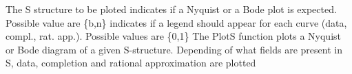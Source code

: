 %
%
%
%
%
%
%
%
%
{}%
{
\fitem[S] The S structure to be ploted
\fitem[g\_t=DVC.PS.graphic\_type\_flag] indicates if a Nyquist
 or a Bode plot is expected. Possible value are \{b,n\}
\fitem[l\_f=DVC.PS.legend\_flag] indicates if a legend should appear for
each curve (data, compl., rat. app.). Possible values are \{0,1\}
}
{}
{The PlotS function plots a Nyquist or Bode diagram of a given
  S-structure. Depending of what fields are present in S, data,
  completion and rational approximation are plotted} 

